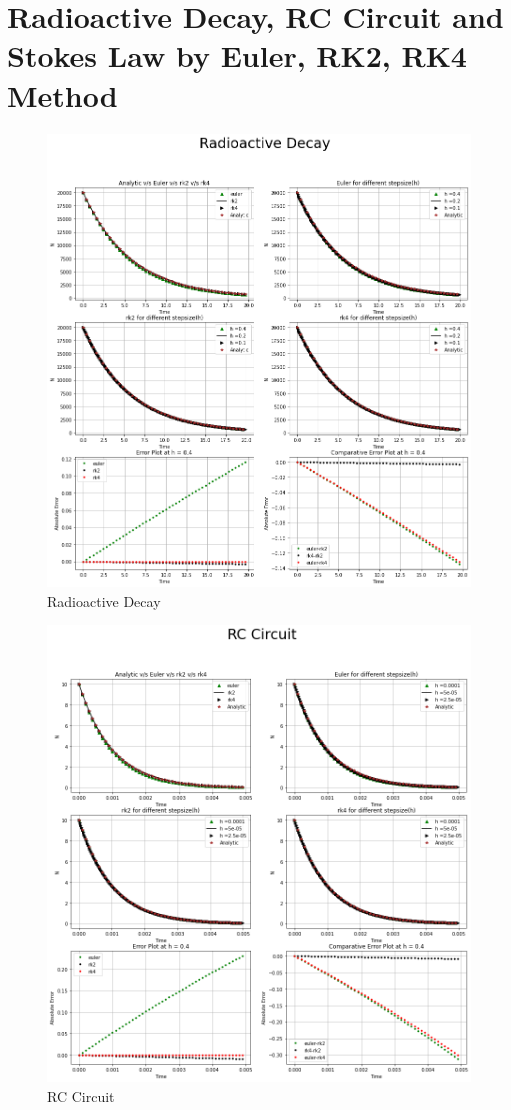 \documentclass{article}
\begin{document}
\section{Radioactive Decay, RC Circuit and Stokes Law by Euler, RK2, RK4 Method}

\newpage
\clearpage
\begin{figure}[h]
    \centering
    \includegraphics[width=14cm,height=12cm \textwidth]{Euler/radioactive.png}
\caption{Radioactive Decay}
\end{figure}
\newpage
\begin{figure}[h]
    \centering
    \includegraphics[width=14cm,height=12cm \textwidth]{Euler/rc.png}
\caption{RC Circuit}
\end{figure}
\end{document}
